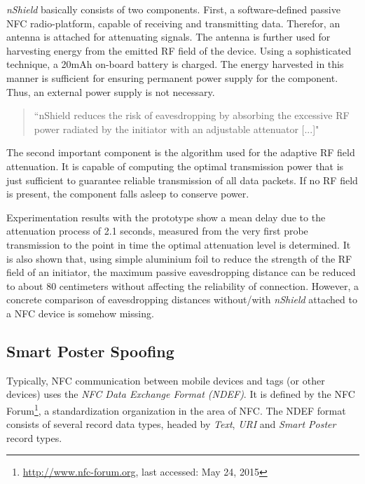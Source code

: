 \documentclass[12pt,a4paper]{article}
\begin{document}
\emph{nShield} basically consists of two components. First, a software-defined passive NFC radio-platform, capable of receiving and transmitting data. Therefor, an antenna is attached for attenuating signals. The antenna is further used for harvesting energy from the emitted RF field of the device. Using a sophisticated technique, a 20mAh on-board battery is charged. The energy harvested in this manner is sufficient for ensuring permanent power supply for the component. Thus, an external power supply is not necessary.

\begin{quote}
``nShield reduces the risk of eavesdropping by absorbing the excessive RF power radiated by the initiator with an adjustable attenuator [...]"\cite{DBLP:conf/mobisys/ZhouX14}
\end{quote}

The second important component is the algorithm used for the adaptive RF field attenuation. It is capable of computing the optimal transmission power that is just sufficient to guarantee reliable transmission of all data packets. If no RF field is present, the component falls asleep to conserve power.

Experimentation results with the prototype show a mean delay due to the attenuation process of 2.1 seconds, measured from the very first probe transmission to the point in time the optimal attenuation level is determined. It is also shown that, using simple aluminium foil to reduce the strength of the RF field of an initiator, the maximum passive eavesdropping distance can be reduced to about 80 centimeters without affecting the reliability of connection. However, a concrete comparison of eavesdropping distances without/with \emph{nShield} attached to a NFC device is somehow missing. 

\subsection{Smart Poster Spoofing}

Typically, NFC communication between mobile devices and tags (or other devices) uses the \emph{NFC Data Exchange Format (NDEF)}. It is defined by the NFC Forum\footnote{\url{http://www.nfc-forum.org}, last accessed: May 24, 2015}, a standardization organization in the area of NFC. The NDEF format consists of several record data types, headed by \emph{Text}, \emph{URI} and \emph{Smart Poster} record types.\cite{DBLP:conf/IEEEares/Mulliner09}\cite{DBLP:conf/mobisys/GummesonPGTZ13}
\end{document}
